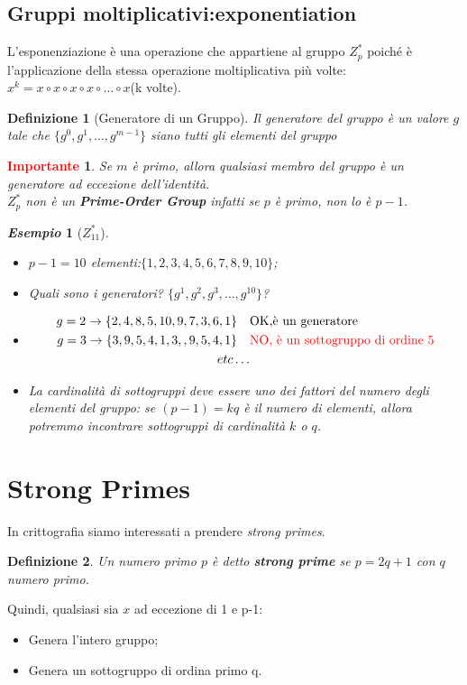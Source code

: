 \documentclass{book}
\newtheorem{Definizione}{\textbf{Definizione}}
\newtheorem*{Importante}{\textbf{\textcolor{red}{Importante}}}
\newtheorem{esempio}{\emph{Esempio}}
\begin{document}
\subsection{Gruppi moltiplicativi:exponentiation}
L'esponenziazione è una operazione che appartiene al gruppo \(Z_{p}^{*}\) poiché è l'applicazione della stessa operazione moltiplicativa più volte:\(x^{k}=x\circ x\circ x\circ x\circ \ldots \circ x\)(k volte).
\begin{Definizione}[Generatore di un Gruppo]
    Il generatore del gruppo è un valore \(g\) tale che \( \{g^{0},g^{1},\ldots ,g^{m-1} \} \) siano tutti gli elementi del gruppo
\end{Definizione}
\begin{Importante}
    Se \(m\) è primo, allora qualsiasi membro del gruppo è un generatore ad eccezione dell'identità\@.\\
    \(Z_{p}^{*}\) non è un \textbf{Prime-Order Group} infatti se \(p\) è primo, non lo è \(p-1\).
\end{Importante}
\newpage
\begin{esempio}[\(Z_{11}^{*}\)]
    \begin{itemize}
        \item \(p-1=10\) elementi:\( \{1,2,3,4,5,6,7,8,9,10 \} \);
        \item Quali sono i generatori? \( \{g^{1},g^{2},g^{3},\ldots ,g^{10}\} \)?
        \item \begin{align*}
                  g=2\rightarrow \{2,4,8,5,10,9,7,3,6,1\}\quad & \text{OK,è un generatore}                                \\
                  g=3\rightarrow \{3,9,5,4,1,3,,9,5,4,1\}\quad & \text{\textcolor{red}{NO, è un sottogruppo di ordine 5}} \\
                  etc\ldots
              \end{align*}
        \item La cardinalità di sottogruppi deve essere uno dei fattori del numero degli elementi del gruppo: se \((p-1)=kq\) è il numero di elementi, allora potremmo incontrare sottogruppi di cardinalità \(k\) o \(q\).
    \end{itemize}
\end{esempio}
\section{Strong Primes}
In crittografia siamo interessati a prendere \emph{strong primes}.
\begin{Definizione}
    Un numero primo \(p\) è detto \textbf{strong prime} se \(p=2q+1\) con \(q\) numero primo.
\end{Definizione}
Quindi, qualsiasi sia \(x\) ad eccezione di 1 e p-1:\begin{itemize}
    \item Genera l'intero gruppo;
    \item Genera un sottogruppo di ordina primo q.
\end{itemize}
\end{document}
